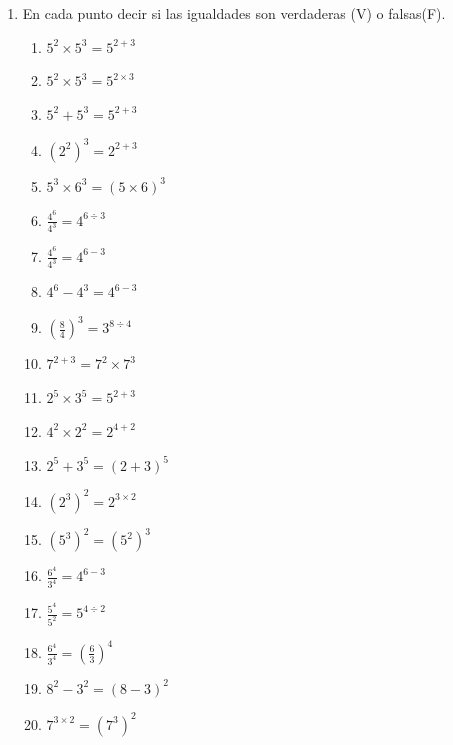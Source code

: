 \begin{enumerate}
	\item En cada punto decir si las igualdades son verdaderas (V) o falsas(F).
	\begin{multicols}{2}
		\begin{enumerate}[label=\Alph*)]
			\item $5^2\times 5^3 = 5^{2+3}$
			\item $5^2\times 5^3 = 5^{2\times 3}$
			\item $5^2 + 5^3 = 5^{2+3}$
			\item ${(2^2)}^3 = 2^{2+3}$
			\item $5^3\times 6^3 = {(5\times6)}^3$
			\item $\frac{4^6}{4^3} = 4^{6\div 3}$
			\item $\frac{4^6}{4^3} = 4^{6-3}$
			\item $4^6 - 4^3 = 4^{6-3}$
			\item ${\left(\frac{8}{4}\right)}^3 = 3^{8\div 4}$
			\item $7^{2+3} = 7^2 \times 7^3$			
			\item $2^5\times 3^5 = 5^{2+3}$
			\item $4^2\times 2^2 = 2^{4+2}$
			\item $2^5 + 3^5 = {(2+3)}^5$
			\item ${(2^3)}^2 = 2^{3\times 2}$
			\item ${(5^3)}^2 = {(5^2)}^3$
			\item $\frac{6^4}{3^4} = 4^{6-3}$
			\item $\frac{5^4}{5^2} = 5^{4\div 2}$
			\item $\frac{6^4}{3^4}  = {{\left(\frac{6}{3}\right)}^4}$
			\item $8^2 - 3^2 = {(8-3)^2}$
			\item $7^{3\times 2} = {(7^3)}^2$
		\end{enumerate}						
	\end{multicols}
	

\end{enumerate}
